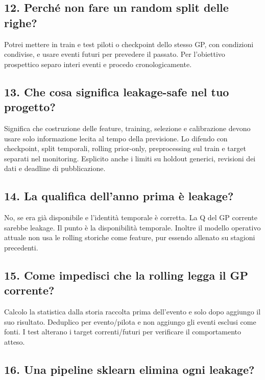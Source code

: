 \documentclass[11pt,a4paper]{article}
\begin{document}
\subsection{12. Perché non fare un random split delle righe?}\label{perchuxe9-non-fare-un-random-split-delle-righe}

Potrei mettere in train e test piloti o checkpoint dello stesso GP, con condizioni condivise, e usare eventi futuri per prevedere il passato. Per l'obiettivo prospettico separo interi eventi e procedo cronologicamente.

\subsection{13. Che cosa significa leakage-safe nel tuo progetto?}\label{che-cosa-significa-leakage-safe-nel-tuo-progetto}

Significa che costruzione delle feature, training, selezione e calibrazione devono usare solo informazione lecita al tempo della previsione. Lo difendo con checkpoint, split temporali, rolling prior-only, preprocessing sul train e target separati nel monitoring. Esplicito anche i limiti su holdout generici, revisioni dei dati e deadline di pubblicazione.

\subsection{14. La qualifica dell'anno prima è leakage?}\label{la-qualifica-dellanno-prima-uxe8-leakage}

No, se era già disponibile e l'identità temporale è corretta. La Q del GP corrente sarebbe leakage. Il punto è la disponibilità temporale. Inoltre il modello operativo attuale non usa le rolling storiche come feature, pur essendo allenato su stagioni precedenti.

\subsection{15. Come impedisci che la rolling legga il GP corrente?}\label{come-impedisci-che-la-rolling-legga-il-gp-corrente}

Calcolo la statistica dalla storia raccolta prima dell'evento e solo dopo aggiungo il suo risultato. Deduplico per evento/pilota e non aggiungo gli eventi esclusi come fonti. I test alterano i target correnti/futuri per verificare il comportamento atteso.

\subsection{16. Una pipeline sklearn elimina ogni leakage?}\label{una-pipeline-sklearn-elimina-ogni-leakage}
\end{document}
